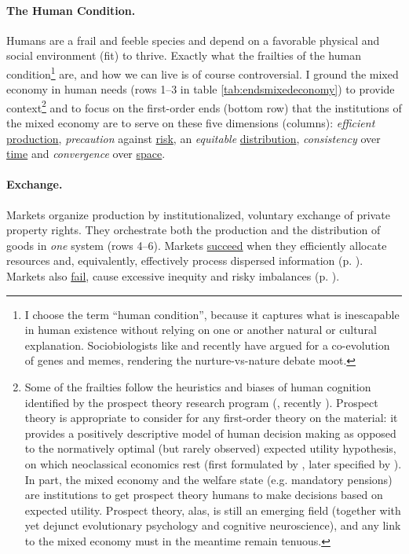 
	

\paragraph{The Human Condition.} \label{sec:humancondition}  Humans are a frail and feeble species and depend on a favorable physical and social environment (fit) to thrive. Exactly what the frailties of the human condition\footnote{
	\label{fn:humancondition}I choose the term ``human condition'', because it captures what is inescapable in human existence without relying on one or another natural or cultural explanation. Sociobiologists like \cite{Boyd1985} and recently \cite{Henrich2007} have argued for a co-evolution of genes and memes, rendering the nurture-vs-nature debate moot.}
are, and how we can live is of course controversial. I ground the mixed economy in human needs (rows 1--3 in table \ref{tab:endsmixedeconomy}) to provide context\footnote{
	Some of the frailties follow the heuristics and biases of human cognition identified by the prospect theory research program (\citealt{Kahneman1979}, recently \citealt{Kahneman2011}). Prospect theory is appropriate to consider for any first-order theory on the material: it provides a positively descriptive model of human decision making as opposed to the normatively optimal (but rarely observed) expected utility hypothesis, on which neoclassical economics rest (first formulated by \citealt{Bernoulli1738}, later specified by \citealt{VonNeumann1944}). In part, the mixed economy and the welfare state (e.g. mandatory pensions) are institutions to get prospect theory humans to make decisions based on expected utility. Prospect theory, alas, is still an emerging field (together with yet dejunct evolutionary psychology and cognitive neuroscience), and any link to the mixed economy must in the meantime remain tenuous.} 
and to focus on the first-order ends (bottom row) that the institutions of the mixed economy are to serve on these five dimensions (columns): \emph{efficient} \hyperref[sec:production]{production}, \emph{precaution} against \hyperref[sec:risk]{risk}, an \emph{equitable} \hyperref[sec:distribution]{distribution}, \emph{consistency} over \hyperref[sec:time]{time} and \emph{convergence} over \hyperref[sec:space]{space}.

\paragraph[Exchange]{Exchange.}  \label{sec:exchange} 
Markets organize production by institutionalized, voluntary exchange of private property rights. They orchestrate both the production and the distribution of goods in \emph{one} system (rows 4--6). Markets \hyperref[sec:marketsolutionsproduction]{succeed} when they efficiently allocate resources and, equivalently, effectively process dispersed information (p. \pageref{sec:marketsolutionsproduction}). Markets also \hyperref[sec:marketfailures]{fail}, cause excessive inequity and risky imbalances (p. \pageref{sec:marketfailures}). 

